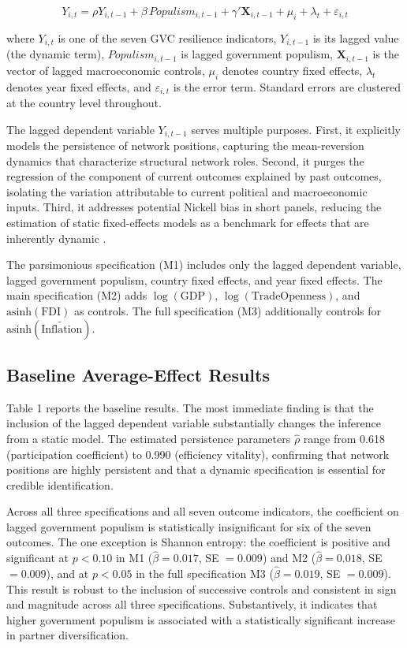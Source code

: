 \documentclass[12pt]{article}
\begin{document}
\begin{equation}
\label{eq:main}
Y_{i,t} = \rho Y_{i,t-1} + \beta \, Populism_{i,t-1} + \gamma' \mathbf{X}_{i,t-1} + \mu_i + \lambda_t + \varepsilon_{i,t}
\end{equation}

where $Y_{i,t}$ is one of the seven GVC resilience indicators, $Y_{i,t-1}$ is its lagged value (the dynamic term), $Populism_{i,t-1}$ is lagged government populism, $\mathbf{X}_{i,t-1}$ is the vector of lagged macroeconomic controls, $\mu_i$ denotes country fixed effects, $\lambda_t$ denotes year fixed effects, and $\varepsilon_{i,t}$ is the error term. Standard errors are clustered at the country level throughout.

The lagged dependent variable $Y_{i,t-1}$ serves multiple purposes. First, it explicitly models the persistence of network positions, capturing the mean-reversion dynamics that characterize structural network roles. Second, it purges the regression of the component of current outcomes explained by past outcomes, isolating the variation attributable to current political and macroeconomic inputs. Third, it addresses potential Nickell bias in short panels, reducing the estimation of static fixed-effects models as a benchmark for effects that are inherently dynamic \citep{nickell1981, arellano1991, blundellbond1998}.

The parsimonious specification (M1) includes only the lagged dependent variable, lagged government populism, country fixed effects, and year fixed effects. The main specification (M2) adds $\log(\text{GDP})$, $\log(\text{TradeOpenness})$, and $\text{asinh}(\text{FDI})$ as controls. The full specification (M3) additionally controls for $\text{asinh}(\widetilde{\text{Inflation}})$.

\subsection{Baseline Average-Effect Results}

Table 1 reports the baseline results. The most immediate finding is that the inclusion of the lagged dependent variable substantially changes the inference from a static model. The estimated persistence parameters $\hat{\rho}$ range from 0.618 (participation coefficient) to 0.990 (efficiency vitality), confirming that network positions are highly persistent and that a dynamic specification is essential for credible identification.

Across all three specifications and all seven outcome indicators, the coefficient on lagged government populism is statistically insignificant for six of the seven outcomes. The one exception is Shannon entropy: the coefficient is positive and significant at $p < 0.10$ in M1 ($\hat{\beta} = 0.017$, SE $= 0.009$) and M2 ($\hat{\beta} = 0.018$, SE $= 0.009$), and at $p < 0.05$ in the full specification M3 ($\hat{\beta} = 0.019$, SE $= 0.009$). This result is robust to the inclusion of successive controls and consistent in sign and magnitude across all three specifications. Substantively, it indicates that higher government populism is associated with a statistically significant increase in partner diversification.
\end{document}
